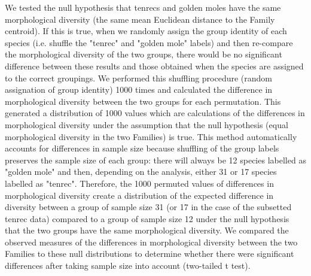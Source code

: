 \documentclass[12pt,a4paper]{article}
\begin{document}
	We tested the null hypothesis that tenrecs and golden moles have the same morphological diversity (the same mean Euclidean distance to the Family centroid). If this is true, when we randomly assign the group identity of each species (i.e. shuffle the "tenrec" and "golden mole" labels) and then re-compare the morphological diversity of the two groups, there would be no significant difference between these results and those obtained when the species are assigned to the correct groupings. 
	We performed this shuffling procedure (random assignation of group identity) 1000 times and calculated the difference in morphological diversity between the two groups for each permutation. This generated a distribution of 1000 values which are calculations of the differences in morphological diversity under the assumption that the null hypothesis (equal morphological diversity in the two Families) is true. This method automatically accounts for differences in sample size because shuffling of the group labels preserves the sample size of each group: there will always be 12 species labelled as "golden mole" and then, depending on the analysis, either 31 or 17 species labelled as "tenrec". Therefore, the 1000 permuted values of differences in morphological diversity create a distribution of the expected difference in diversity between a group of sample size 31 (or 17 in the case of the subsetted tenrec data) compared to a group of sample size 12 under the null hypothesis that the two groups have the same morphological diversity. We compared the observed measures of the differences in morphological diversity between the two Families to these null distributions to determine whether there were significant differences after taking sample size into account (two-tailed t test).
\end{document}
